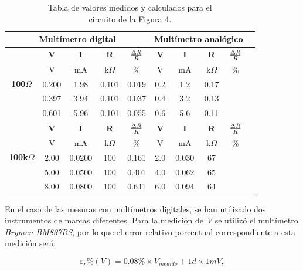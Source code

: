 \documentclass{article}
\begin{document}
\begin{table}[!hbt]
	\begin{center}

		\begin{tabular}{|c|c|c|c|c|c|c|c|c|c|} \hline
			\multicolumn{5}{|c|}{\textbf{Multímetro digital}} & \multicolumn{4}{|c|}{\textbf{Multímetro analógico}} \\ \hline
			\multirow{5}{*}{\textbf{100$\Omega$}} 
			& \textbf{V} & \textbf{I} & \textbf{R} & \textbf{${\Delta R \over R}$} & \textbf{V} & \textbf{I} & \textbf{R} & \textbf{${\Delta R \over R}$} \\\cline{2-9}
			& V & mA & k$\Omega$ & \% & V & mA & k$\Omega$ & \% \\\cline{2-9}
			& 0.200 & 1.98 & 0.101 & 0.019 & 0.2 & 1.2 & 0.17 &  \\\cline{2-9}
			& 0.397 & 3.94 & 0.101 & 0.037 & 0.4 & 3.2 & 0.13 &  \\\cline{2-9}
			& 0.601 & 5.96 & 0.101 & 0.055 & 0.6 & 5.6 & 0.11 &  \\ \hline
			\multirow{5}{*}{\textbf{100k$\Omega$}} 
			& \textbf{V} & \textbf{I} & \textbf{R} & \textbf{${\Delta R \over R}$} & \textbf{V} & \textbf{I} & \textbf{R} & \textbf{${\Delta R \over R}$} \\\cline{2-9}
			& V & mA & k$\Omega$ & \% & V & mA & k$\Omega$ & \% \\\cline{2-9}
			& 2.00 & 0.0200 & 100 & 0.161 & 2.0 & 0.030 & 67 &  \\\cline{2-9}
			& 5.00 & 0.0500 & 100 & 0.401 & 4.0 & 0.062 & 65 &  \\\cline{2-9}
			& 8.00 & 0.0800 & 100 & 0.641 & 6.0 & 0.094 & 64 &  \\ \hline
		\end{tabular}

	\caption{Tabla de valores medidos y calculados para el\\ circuito de la Figura 4.}
	\end{center}
\end{table}
\bigskip


	En el caso de las mesuras con multímetros digitales, se han utilizado dos instrumentos de marcas diferentes. Para la medición de \textit{V} se utilizó el multímetro \textit{Brymen BM837RS}, por lo que el error relativo porcentual correspondiente a esta medición será:
\medskip

\begin{equation}
 	\varepsilon_r\%(V) = 0.08\%\times V_{medido} + 1d\times 1mV,
\end{equation}
\medskip
\end{document}
